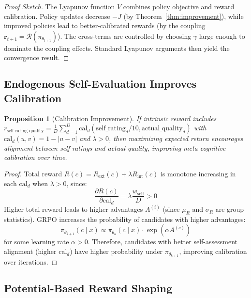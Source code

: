 \documentclass{article}
\theoremstyle{plain}
\newtheorem{proposition}[theorem]{Proposition}
\theoremstyle{definition}
\theoremstyle{remark}
\begin{document}
\begin{proof}[Proof Sketch]
The Lyapunov function $V$ combines policy objective and reward calibration. Policy updates decrease $-J$ (by Theorem~\ref{thm:improvement}), while improved policies lead to better-calibrated rewards (by the coupling $\mathbf{r}_{t+1} = \mathcal{R}(\pi_{\theta_{t+1}})$). The cross-terms are controlled by choosing $\gamma$ large enough to dominate the coupling effects. Standard Lyapunov arguments then yield the convergence result.
\end{proof}

\subsection{Endogenous Self-Evaluation Improves Calibration}

\begin{proposition}[Calibration Improvement]
\label{prop:calibration}
If intrinsic reward includes $r_{\text{self\_rating\_quality}} = \frac{1}{D} \sum_{d=1}^{D} \text{cal}_d(\text{self\_rating}_d/10, \text{actual\_quality}_d)$ with $\text{cal}_d(u,v) = 1 - |u - v|$ and $\lambda > 0$, then maximizing expected return encourages alignment between self-ratings and actual quality, improving meta-cognitive calibration over time.
\end{proposition}

\begin{proof}
Total reward $R(c) = R_{\text{ext}}(c) + \lambda R_{\text{int}}(c)$ is monotone increasing in each $\text{cal}_d$ when $\lambda > 0$, since:
\begin{equation}
\frac{\partial R(c)}{\partial \text{cal}_d} = \lambda \frac{w_{\text{self}}}{D} > 0
\end{equation}
Higher total reward leads to higher advantages $A^{(i)}$ (since $\mu_R$ and $\sigma_R$ are group statistics). GRPO increases the probability of candidates with higher advantages:
\begin{equation}
\pi_{\theta_{k+1}}(c \mid x) \propto \pi_{\theta_k}(c \mid x) \cdot \exp(\alpha A^{(c)})
\end{equation}
for some learning rate $\alpha > 0$. Therefore, candidates with better self-assessment alignment (higher $\text{cal}_d$) have higher probability under $\pi_{\theta_{k+1}}$, improving calibration over iterations.
\end{proof}

\subsection{Potential-Based Reward Shaping}
\end{document}
